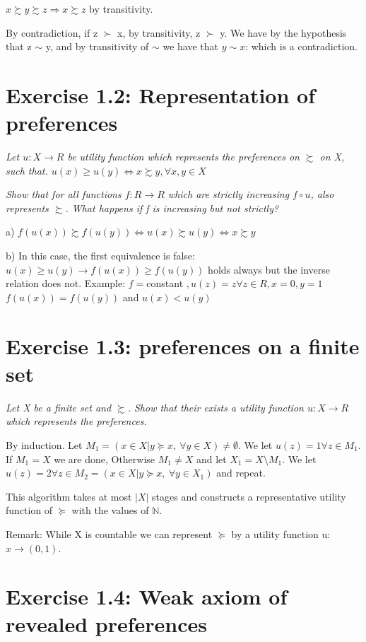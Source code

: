 \documentclass[11pt]{article} %
\begin{document}
$x \succsim y \succsim z \Rightarrow  x \succsim z$ by transitivity.

By contradiction, if  z $\succ$ x, by transitivity,  z $\succ$ y. We have by the hypothesis that z $\sim$ y, and by transitivity of $\sim$ we have that $y \sim x$: which is a contradiction. 

\section*{Exercise 1.2: Representation of preferences}

\textit{Let $u:X \rightarrow R$ be utility function which represents the preferences on $\succsim$ on X, such that.
$u(x) \geq u(y) \iff x \succsim y, \forall x,y \in X$}

\textit{Show that for all functions $f:R \rightarrow R$ which are strictly increasing $f \circ u$, also represents $\succsim$. What happens if f is increasing but not strictly?  }

a) $ f(u(x)) \succsim f(u(y)) \iff u(x) \succsim u(y) \iff x \succsim y$

b) In this case, the first equivalence is false:
$u(x) \geq u(y) \rightarrow f(u(x)) \geq f(u(y))$ holds always but the inverse relation does not. 
Example: $f=$constant $, u(z)=z \forall z \in R, x=0, y=1$
$f(u(x))=f(u(y))$ and $u(x)<u(y)$ 

\section*{Exercise 1.3: preferences on a finite set}

\textit{Let X be a finite set and $\succsim$. Show that their exists a utility function $u:X \rightarrow R$ which represents the preferences.}

By induction. Let $M_1 = (x \in X \vert y \succeq  x, \ \forall y \in X) \ne\emptyset $.
We let $u(z)=1 \forall z \in M_1$.
If $M_1 = X$ we are done, 
Otherwise $M_1 \neq X$ and let $ X_1= X \setminus M_1 $.
We let $u(z)=2 \forall z \in M_2= (x \in X \vert y \succeq  x, \ \forall y \in X_1)$
and repeat.

This algorithm takes at most $|X|$ stages and constructs a representative utility function of $\succeq$ with the values of $\mathbb{N} $.

Remark: While X is countable we can represent $ \succeq $ by a utility function u: $x \rightarrow (0,1)$.

\section*{Exercise 1.4: Weak axiom of revealed preferences}
\end{document}
